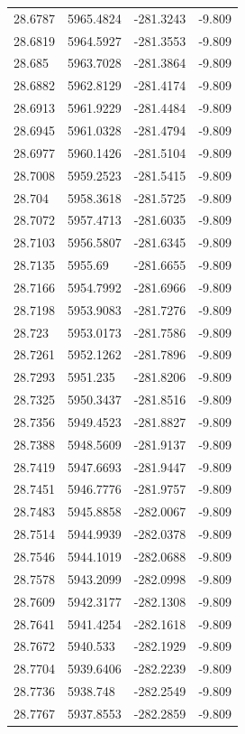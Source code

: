 \begin{table}[H]
\begin{tabular}{llll}
28.6787 & 5965.4824 & -281.3243 & -9.809 \\
28.6819 & 5964.5927 & -281.3553 & -9.809 \\
28.685 & 5963.7028 & -281.3864 & -9.809 \\
28.6882 & 5962.8129 & -281.4174 & -9.809 \\
28.6913 & 5961.9229 & -281.4484 & -9.809 \\
28.6945 & 5961.0328 & -281.4794 & -9.809 \\
28.6977 & 5960.1426 & -281.5104 & -9.809 \\
28.7008 & 5959.2523 & -281.5415 & -9.809 \\
28.704 & 5958.3618 & -281.5725 & -9.809 \\
28.7072 & 5957.4713 & -281.6035 & -9.809 \\
28.7103 & 5956.5807 & -281.6345 & -9.809 \\
28.7135 & 5955.69 & -281.6655 & -9.809 \\
28.7166 & 5954.7992 & -281.6966 & -9.809 \\
28.7198 & 5953.9083 & -281.7276 & -9.809 \\
28.723 & 5953.0173 & -281.7586 & -9.809 \\
28.7261 & 5952.1262 & -281.7896 & -9.809 \\
28.7293 & 5951.235 & -281.8206 & -9.809 \\
28.7325 & 5950.3437 & -281.8516 & -9.809 \\
28.7356 & 5949.4523 & -281.8827 & -9.809 \\
28.7388 & 5948.5609 & -281.9137 & -9.809 \\
28.7419 & 5947.6693 & -281.9447 & -9.809 \\
28.7451 & 5946.7776 & -281.9757 & -9.809 \\
28.7483 & 5945.8858 & -282.0067 & -9.809 \\
28.7514 & 5944.9939 & -282.0378 & -9.809 \\
28.7546 & 5944.1019 & -282.0688 & -9.809 \\
28.7578 & 5943.2099 & -282.0998 & -9.809 \\
28.7609 & 5942.3177 & -282.1308 & -9.809 \\
28.7641 & 5941.4254 & -282.1618 & -9.809 \\
28.7672 & 5940.533 & -282.1929 & -9.809 \\
28.7704 & 5939.6406 & -282.2239 & -9.809 \\
28.7736 & 5938.748 & -282.2549 & -9.809 \\
28.7767 & 5937.8553 & -282.2859 & -9.809 \\

\end{tabular}
\end{table}
